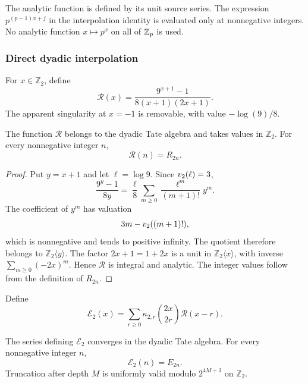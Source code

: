 \begin{histremark}\label{hist:rem:depleted_factor_boundary}
The analytic function is defined by its unit source series. The expression \(p^{(p-1)x+j}\) in the interpolation identity is evaluated only at nonnegative integers. No analytic function \(x\mapsto p^x\) on all of \(\mathbb Z_p\) is used.
\end{histremark}

\subsubsection{Direct dyadic interpolation}

For \(x\in\mathbb Z_2\), define
\[
\boxed{
\mathscr R(x)
=
\frac{9^{x+1}-1}{8(x+1)(2x+1)}.
}
\]
The apparent singularity at \(x=-1\) is removable, with value \(-\log(9)/8\).

\begin{histlemma}\label{hist:lem:analytic_dyadic_source}
The function \(\mathscr R\) belongs to the dyadic Tate algebra and takes values in \(\mathbb Z_2\). For every nonnegative integer \(n\),
\[
\boxed{\mathscr R(n)=R_{2n}.}
\]
\end{histlemma}

\begin{proof}
Put \(y=x+1\) and let \(\ell=\log 9\). Since \(v_2(\ell)=3\),
\[
\frac{9^y-1}{8y}
=
\frac{\ell}{8}
\sum_{m\geq0}
\frac{\ell^m}{(m+1)!}y^m.
\]
The coefficient of \(y^m\) has valuation
\[
3m-v_2((m+1)!),
\]
which is nonnegative and tends to positive infinity. The quotient therefore belongs to \(\mathbb Z_2\langle y\rangle\). The factor \(2x+1=1+2x\) is a unit in \(\mathbb Z_2\langle x\rangle\), with inverse \(\sum_{m\geq0}(-2x)^m\). Hence \(\mathscr R\) is integral and analytic. The integer values follow from the definition of \(R_{2n}\).
\end{proof}

Define
\[
\boxed{
\mathscr E_2(x)
=
\sum_{r\geq0}
\kappa_{2,r}
\binom{2x}{2r}
\mathscr R(x-r).
}
\]

\begin{histtheorem}\label{hist:thm:direct_dyadic_interpolation}
The series defining \(\mathscr E_2\) converges in the dyadic Tate algebra. For every nonnegative integer \(n\),
\[
\boxed{\mathscr E_2(n)=E_{2n}.}
\]
Truncation after depth \(M\) is uniformly valid modulo \(2^{4M+3}\) on \(\mathbb Z_2\).
\end{histtheorem}

